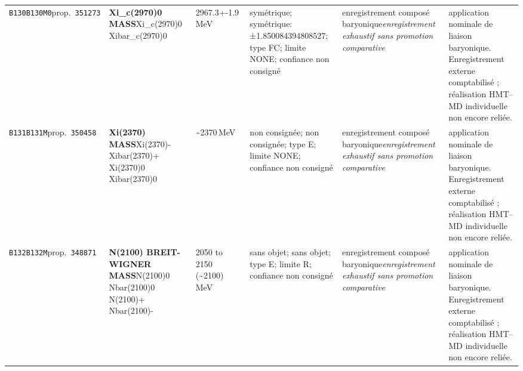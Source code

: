 \begin{landscape}
\begin{longtable}{L{1.85cm}L{4.45cm}L{2.35cm}L{4.05cm}L{3.35cm}L{7.15cm}}
\texttt{B130}\newline \texttt{B130M0}\newline prop.\ \texttt{351273} & \textbf{Xi\_\allowbreak{}c(2970)0 MASS}\newline Xi\_\allowbreak{}c(2970)0 \textbar{}\allowbreak{} Xibar\_\allowbreak{}c(2970)0 & 2967.3+-1.9\,MeV & symétrique; symétrique: ±1.850084394808527; type FC; limite NONE; confiance non consigné & enregistrement composé baryonique\newline \emph{enregistrement exhaustif sans promotion comparative} & application nominale de liaison baryonique. Enregistrement externe comptabilisé ; réalisation HMT--MD individuelle non encore reliée. \\
\texttt{B131}\newline \texttt{B131M}\newline prop.\ \texttt{350458} & \textbf{Xi(2370) MASS}\newline Xi(2370)- \textbar{}\allowbreak{} Xibar(2370)+ \textbar{}\allowbreak{} Xi(2370)0 \textbar{}\allowbreak{} Xibar(2370)0 & \textasciitilde{}2370\,MeV & non consignée; non consignée; type E; limite NONE; confiance non consigné & enregistrement composé baryonique\newline \emph{enregistrement exhaustif sans promotion comparative} & application nominale de liaison baryonique. Enregistrement externe comptabilisé ; réalisation HMT--MD individuelle non encore reliée. \\
\texttt{B132}\newline \texttt{B132M}\newline prop.\ \texttt{348871} & \textbf{N(2100) BREIT-WIGNER MASS}\newline N(2100)0 \textbar{}\allowbreak{} Nbar(2100)0 \textbar{}\allowbreak{} N(2100)+ \textbar{}\allowbreak{} Nbar(2100)- & 2050 to 2150 (\textasciitilde{}2100)\,MeV & sans objet; sans objet; type E; limite R; confiance non consigné & enregistrement composé baryonique\newline \emph{enregistrement exhaustif sans promotion comparative} & application nominale de liaison baryonique. Enregistrement externe comptabilisé ; réalisation HMT--MD individuelle non encore reliée. \\

\end{longtable}
\end{landscape}
